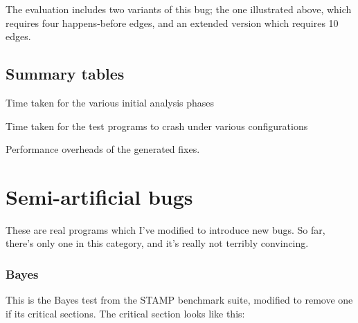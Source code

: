 The evaluation includes two variants of this bug; the one illustrated
above, which requires four happens-before edges, and an extended
version which requires 10 edges.

\subsection{Summary tables}

\begin{sidewaystable}

\caption{Time taken for the various initial analysis phases}
\label{table:eval:analysis_phases}
\end{sidewaystable}

\begin{sidewaystable}

\caption{Time taken for the test programs to crash under various configurations}
\label{table:eval:crash_times}
\end{sidewaystable}

\begin{sidewaystable}

\caption{Performance overheads of the generated fixes.}  
\label{table:eval:perf_dists}
\end{sidewaystable}

\section{Semi-artificial bugs}

These are real programs which I've modified to introduce new bugs.  So
far, there's only one in this category, and it's really not terribly
convincing.

\subsubsection{Bayes}

This is the Bayes test from the STAMP benchmark suite, modified to
remove one if its critical sections.  The critical section looks like
this:

